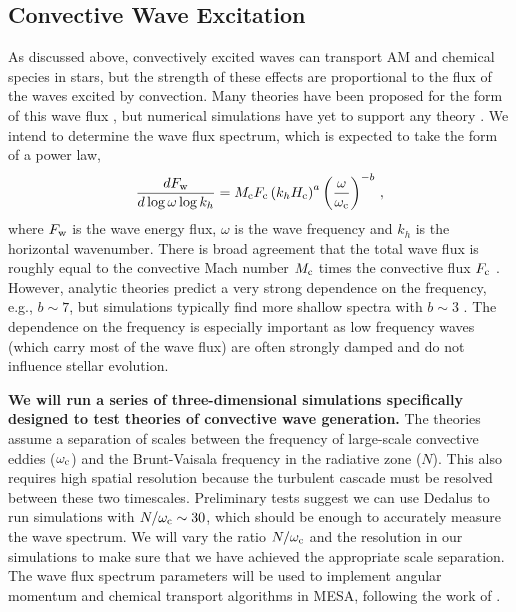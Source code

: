 \subsection{Convective Wave Excitation}
\label{convex}

As discussed above, convectively excited waves can transport AM and chemical species in stars, but the strength of these effects are proportional to the flux of the waves excited by convection. Many theories have been proposed for the form of this wave flux \citep{Press_1981,Goldreich_1990,Belkacem_2008,Lecoanet_2013}, but numerical simulations have yet to support any theory \citep{Rogers_2006,Rogers_2013,Alvan_2014,Lecoanet_2015}. We intend to determine the wave flux spectrum, which is expected to take the form of a power law,
\begin{equation}
\frac{d F_{\rm w}}{d\log \omega \log k_h} = M_{\rm c}F_{\rm c} \left(k_h H_{\rm c}\right)^{a} \left(\frac{\omega}{\omega_{\rm c}}\right)^{-b} \, ,
\end{equation}
where $F_{\rm w}$ is the wave energy flux, $\omega$ is the wave frequency and $k_h$ is the horizontal wavenumber. There is broad agreement that the total wave flux is roughly equal to the convective Mach number $M_{\rm c}$ times the convective flux $F_{\rm c}$ \citep[e.g.,][]{Rogers_2013,Lecoanet_2015}. However, analytic theories predict a very strong dependence on the frequency, e.g., $b\sim 7$, but simulations typically find more shallow spectra with $b\sim 3$ \citep{Rogers_2013}. The dependence on the frequency is especially important as low frequency waves (which carry most of the wave flux) are often strongly damped and do not influence stellar evolution. 

{\bf We will run a series of three-dimensional simulations specifically designed to test theories of convective wave generation.} The theories assume a separation of scales between the frequency of large-scale convective eddies ($\omega_{\rm c}$) and the Brunt-Vaisala frequency in the radiative zone ($N$). This also requires high spatial resolution because the turbulent cascade must be resolved between these two timescales. Preliminary tests suggest we can use Dedalus to run simulations with $N/\omega_{\rm c}\sim 30$, which should be enough to accurately measure the wave spectrum. We will vary the ratio $N/\omega_{\rm c}$ and the resolution in our simulations to make sure that we have achieved the appropriate scale separation. The wave flux spectrum parameters will be used to implement angular momentum and chemical transport algorithms in MESA, following the work of \citet{fullerwave:14,fullerwave:15}.  %


